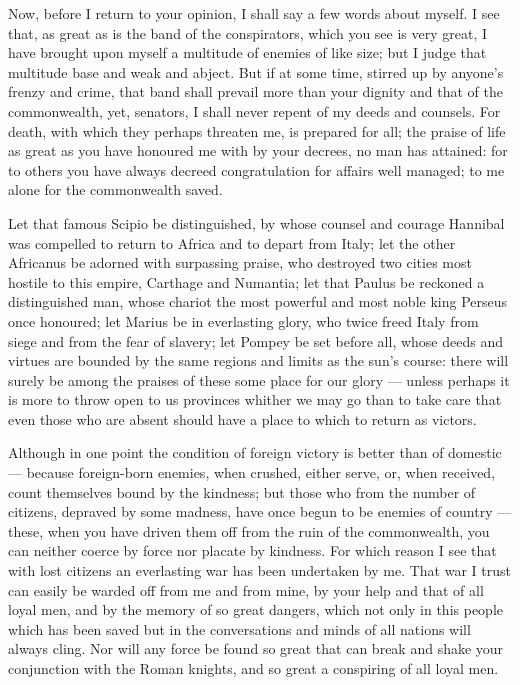  Now, before I return to your opinion, I shall say a few words about myself. I see that, as great as is the band of the conspirators, which you see is very great, I have brought upon myself a multitude of enemies of like size; but I judge that multitude base and weak and abject. But if at some time, stirred up by anyone's frenzy and crime, that band shall prevail more than your dignity and that of the commonwealth, yet, senators, I shall never repent of my deeds and counsels. For death, with which they perhaps threaten me, is prepared for all; the praise of life as great as you have honoured me with by your decrees, no man has attained: for to others you have always decreed congratulation for affairs well managed; to me alone for the commonwealth saved.

 Let that famous Scipio be distinguished, by whose counsel and courage Hannibal was compelled to return to Africa and to depart from Italy; let the other Africanus be adorned with surpassing praise, who destroyed two cities most hostile to this empire, Carthage and Numantia; let that Paulus be reckoned a distinguished man, whose chariot the most powerful and most noble king Perseus once honoured; let Marius be in everlasting glory, who twice freed Italy from siege and from the fear of slavery; let Pompey be set before all, whose deeds and virtues are bounded by the same regions and limits as the sun's course: there will surely be among the praises of these some place for our glory --- unless perhaps it is more to throw open to us provinces whither we may go than to take care that even those who are absent should have a place to which to return as victors.

 Although in one point the condition of foreign victory is better than of domestic --- because foreign-born enemies, when crushed, either serve, or, when received, count themselves bound by the kindness; but those who from the number of citizens, depraved by some madness, have once begun to be enemies of country --- these, when you have driven them off from the ruin of the commonwealth, you can neither coerce by force nor placate by kindness. For which reason I see that with lost citizens an everlasting war has been undertaken by me. That war I trust can easily be warded off from me and from mine, by your help and that of all loyal men, and by the memory of so great dangers, which not only in this people which has been saved but in the conversations and minds of all nations will always cling. Nor will any force be found so great that can break and shake your conjunction with the Roman knights, and so great a conspiring of all loyal men.

